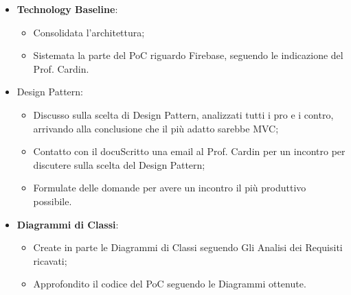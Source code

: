 \documentclass[a4paper, oneside, openany, dvipsnames, table]{article}
\begin{document}
\begin{itemize}
\item \textbf{Technology Baseline}: 
	\begin{itemize}
		\item Consolidata l'architettura;
		\item Sistemata la parte del PoC riguardo Firebase, seguendo le indicazione del Prof. Cardin.
	\end{itemize}
\item Design Pattern:
	\begin{itemize}
	\item  Discusso sulla scelta di Design Pattern, analizzati tutti i pro e i contro, arrivando alla conclusione che il più adatto sarebbe MVC;
	\item Contatto con il docuScritto una email al Prof. Cardin per un incontro per discutere sulla scelta del Design Pattern;
	\item Formulate delle domande per avere un incontro il più produttivo possibile. 	
	\end{itemize}
\item  \textbf{Diagrammi di Classi}:
	\begin{itemize}
		\item Create in parte le Diagrammi di Classi seguendo Gli Analisi dei Requisiti ricavati;
		\item Approfondito il codice del PoC  seguendo le Diagrammi ottenute.
	\end{itemize}
\end{itemize}
\end{document}
